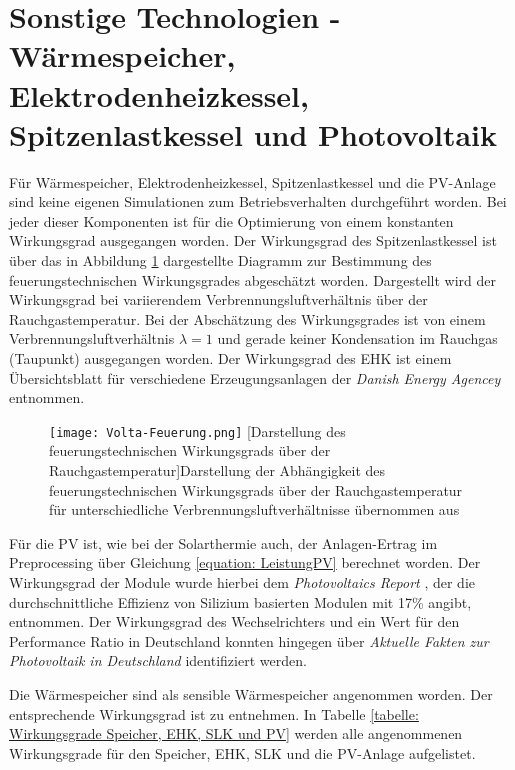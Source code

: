 \section[Sonstige Technologien]{Sonstige Technologien - Wärmespeicher, Elektrodenheizkessel, Spitzenlastkessel und Photovoltaik}
Für Wärmespeicher, Elektrodenheizkessel, Spitzenlastkessel und die \ac{PV}-Anlage sind keine eigenen Simulationen zum Betriebsverhalten durchgeführt worden. Bei jeder dieser Komponenten ist für die Optimierung von einem konstanten Wirkungsgrad ausgegangen worden. Der Wirkungsgrad des Spitzenlastkessel ist über das in Abbildung \ref{fig: Volta-Feuerung} dargestellte Diagramm zur Bestimmung des feuerungstechnischen Wirkungsgrades \cite{Volta2018} abgeschätzt worden. Dargestellt wird der Wirkungsgrad bei variierendem Verbrennungsluftverhältnis über der Rauchgastemperatur. Bei der Abschätzung des Wirkungsgrades ist von einem Verbrennungsluftverhältnis $\lambda = 1$ und gerade keiner Kondensation im Rauchgas (Taupunkt) ausgegangen worden. Der Wirkungsgrad des \acl{EHK} ist einem Übersichtsblatt für verschiedene Erzeugungsanlagen der \textit{Danish Energy Agencey} \cite{Energinet} entnommen.
	\begin{figure}[ht]
		\centering
		\texttt{[image: Volta-Feuerung.png]}
		[Darstellung des feuerungstechnischen Wirkungsgrads über der Rauchgastemperatur]{Darstellung der Abhängigkeit des feuerungstechnischen Wirkungsgrads über der Rauchgastemperatur für unterschiedliche Verbrennungsluftverhältnisse übernommen aus \cite{Volta2018}}
		\label{fig: Volta-Feuerung}
	\end{figure}

Für die \acl{PV} ist, wie bei der Solarthermie auch, der Anlagen-Ertrag im Preprocessing über Gleichung \ref{equation: LeistungPV} berechnet worden. Der Wirkungsgrad der Module wurde hierbei dem \textit{Photovoltaics Report} \cite{ISE10}, der die durchschnittliche Effizienz von Silizium basierten Modulen mit 17\% angibt, entnommen. Der Wirkungsgrad des Wechselrichters und ein Wert für den Performance Ratio in Deutschland konnten hingegen über \textit{Aktuelle Fakten zur Photovoltaik in Deutschland} \cite{ISE} identifiziert werden. 

Die Wärmespeicher sind als sensible Wärmespeicher angenommen worden. Der entsprechende Wirkungsgrad ist \citet{Kaldemeyer2019} zu entnehmen. In Tabelle \ref{tabelle: Wirkungsgrade Speicher, EHK, SLK und PV} werden alle angenommenen Wirkungsgrade für den Speicher, \acl{EHK}, \acl{SLK} und die \ac{PV}-Anlage aufgelistet. 

